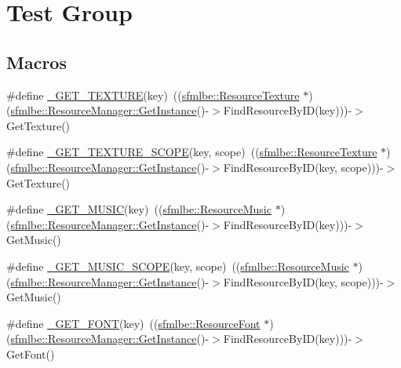 \hypertarget{group___t_e_s_t___g_r_o_u_p}{}\section{Test Group}
\label{group___t_e_s_t___g_r_o_u_p}
\subsection*{Macros}
\begin{DoxyCompactItemize}
\item 
\#define \mbox{\hyperlink{group___t_e_s_t___g_r_o_u_p_ga6cb231e771687ec2365d07dbbc4ca84e}{\+\_\+\+G\+E\+T\+\_\+\+T\+E\+X\+T\+U\+RE}}(key)~((\mbox{\hyperlink{classsfmlbe_1_1_resource_texture}{sfmlbe\+::\+Resource\+Texture}} $\ast$)(\mbox{\hyperlink{classsfmlbe_1_1_singleton_a313529b2a097425bf5500df8848ead3e}{sfmlbe\+::\+Resource\+Manager\+::\+Get\+Instance}}()-\/$>$Find\+Resource\+By\+ID(key)))-\/$>$Get\+Texture()
\item 
\#define \mbox{\hyperlink{group___t_e_s_t___g_r_o_u_p_ga0c23c831a3c8c789dce76c32337c164f}{\+\_\+\+G\+E\+T\+\_\+\+T\+E\+X\+T\+U\+R\+E\+\_\+\+S\+C\+O\+PE}}(key,  scope)~((\mbox{\hyperlink{classsfmlbe_1_1_resource_texture}{sfmlbe\+::\+Resource\+Texture}} $\ast$)(\mbox{\hyperlink{classsfmlbe_1_1_singleton_a313529b2a097425bf5500df8848ead3e}{sfmlbe\+::\+Resource\+Manager\+::\+Get\+Instance}}()-\/$>$Find\+Resource\+By\+ID(key, scope)))-\/$>$Get\+Texture()
\item 
\#define \mbox{\hyperlink{group___t_e_s_t___g_r_o_u_p_ga8d8081f0d0ad6f79d654778d16870bca}{\+\_\+\+G\+E\+T\+\_\+\+M\+U\+S\+IC}}(key)~((\mbox{\hyperlink{classsfmlbe_1_1_resource_music}{sfmlbe\+::\+Resource\+Music}} $\ast$)(\mbox{\hyperlink{classsfmlbe_1_1_singleton_a313529b2a097425bf5500df8848ead3e}{sfmlbe\+::\+Resource\+Manager\+::\+Get\+Instance}}()-\/$>$Find\+Resource\+By\+ID(key)))-\/$>$Get\+Music()
\item 
\#define \mbox{\hyperlink{group___t_e_s_t___g_r_o_u_p_gaee599e12f9611ff5a4c5fe1de5d9e426}{\+\_\+\+G\+E\+T\+\_\+\+M\+U\+S\+I\+C\+\_\+\+S\+C\+O\+PE}}(key,  scope)~((\mbox{\hyperlink{classsfmlbe_1_1_resource_music}{sfmlbe\+::\+Resource\+Music}} $\ast$)(\mbox{\hyperlink{classsfmlbe_1_1_singleton_a313529b2a097425bf5500df8848ead3e}{sfmlbe\+::\+Resource\+Manager\+::\+Get\+Instance}}()-\/$>$Find\+Resource\+By\+ID(key, scope)))-\/$>$Get\+Music()
\item 
\#define \mbox{\hyperlink{group___t_e_s_t___g_r_o_u_p_ga171b5a386e18923861417af7b15ecdd7}{\+\_\+\+G\+E\+T\+\_\+\+F\+O\+NT}}(key)~((\mbox{\hyperlink{classsfmlbe_1_1_resource_font}{sfmlbe\+::\+Resource\+Font}} $\ast$)(\mbox{\hyperlink{classsfmlbe_1_1_singleton_a313529b2a097425bf5500df8848ead3e}{sfmlbe\+::\+Resource\+Manager\+::\+Get\+Instance}}()-\/$>$Find\+Resource\+By\+ID(key)))-\/$>$Get\+Font()

\end{DoxyCompactItemize}

